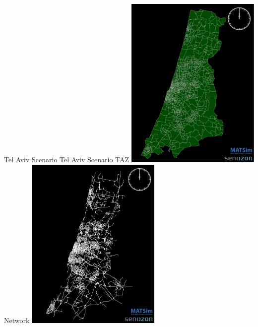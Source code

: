 \createfigure%
{Tel Aviv Scenario}%
{Tel Aviv Scenario}%
{\label{fig:telavivscenario}}%
{%
  \createsubfigure%
  {TAZ}%
  {\includegraphics[width=0.49\textwidth,angle=0]{using/figures/TelAviv_TAZ}}%
  {\label{fig:TAZ}}%
  {}%
  \createsubfigure%
  {Network}%
	{\includegraphics[width=0.49\textwidth,angle=0]{using/figures/TelAviv_RoadNetwork}}%
  {\label{fig:network}}%
  {}%
}%
{}

